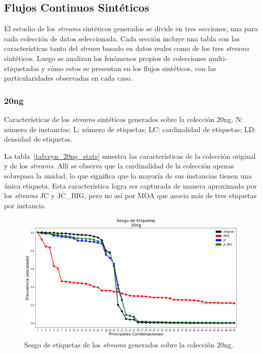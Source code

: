 \subsection{Flujos Continuos Sintéticos}
\label{experimentos_syn_streams}

El estudio de los \textit{streams} sintéticos generados se divide en tres
secciones, una para cada colección de datos seleccionada. Cada sección incluye
una tabla con las características tanto del \textit{stream} basado en datos
reales como de los tres \textit{streams} sintéticos. Luego se analizan los
fenómenos propios de colecciones multi-etiquetadas y cómo estos se presentan en
los flujos sintéticos, con las particularidades observadas en cada caso.

\subsubsection{20ng}

\begin{table}[htbp]
	\centering
	\begin{adjustbox}{max width=\textwidth}
		
	\end{adjustbox}
	\caption[Características de los \textit{streams} sintéticos generados sobre
		la colección 20ng.]{Características de los \textit{streams} sintéticos generados sobre
		la colección 20ng.  N: número de instancias; L: número de etiquetas; LC:
		cardinalidad de etiquetas; LD: densidad de etiquetas.}
	\label{tab:syn_20ng_stats}
\end{table}

La tabla~\ref{tab:syn_20ng_stats} muestra las características de la colección
original y de los \textit{streams}. Allí se observa que la cardinalidad de la
colección apenas sobrepasa la unidad, lo que significa que la mayoría de sus
instancias tienen una única etiqueta. Esta característica logra ser capturada de
manera aproximada por los \textit{streams} JC y JC\_BIG, pero no así por MOA que
asocia más de tres etiquetas por instancia.

\begin{figure}[htbp]
	\includegraphics[width=\linewidth]{figures/experiments/syn/20ng/label_skew.png}
	\caption{Sesgo de etiquetas de los \textit{streams} generados sobre la colección
		20ng.}
	\label{fig:syn_20ng_label_skew}
\end{figure}

